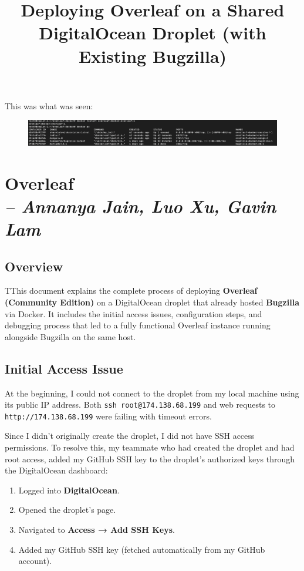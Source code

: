 This was what was seen:
\begin{figure}
    \centering
    \includegraphics[width=1.0\linewidth]{png/finally_fixed.png}
\end{figure}\chapter{Overleaf \\
\small{\textit{-- Annanya Jain, Luo Xu, Gavin Lam}
\label{Chapter::Overleaf}}}

\title{Deploying Overleaf on a Shared DigitalOcean Droplet (with Existing Bugzilla)}
\section{Overview}
TThis document explains the complete process of deploying \textbf{Overleaf (Community Edition)} on a DigitalOcean droplet that already hosted \textbf{Bugzilla} via Docker.  
It includes the initial access issues, configuration steps, and debugging process that led to a fully functional Overleaf instance running alongside Bugzilla on the same host.

\section{Initial Access Issue}
At the beginning, I could not connect to the droplet from my local machine using its public IP address.  
Both \texttt{ssh root@174.138.68.199} and web requests to \texttt{http://174.138.68.199} were failing with timeout errors.

Since I didn’t originally create the droplet, I did not have SSH access permissions. To resolve this, my teammate who had created the droplet and had root access, added my GitHub SSH key to the droplet’s authorized keys through the DigitalOcean dashboard:

\begin{enumerate}
  \item Logged into \textbf{DigitalOcean}.
  \item Opened the droplet’s page.
  \item Navigated to \textbf{Access → Add SSH Keys}.
  \item Added my GitHub SSH key (fetched automatically from my GitHub account).
\end{enumerate}

